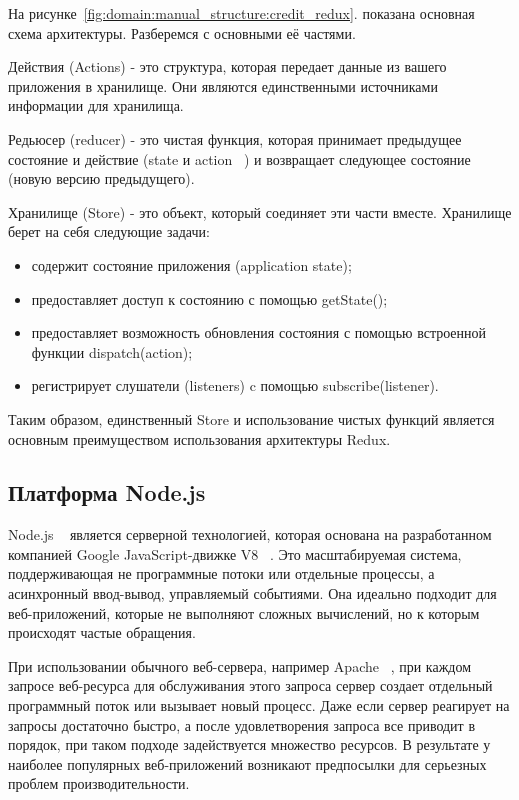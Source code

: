 На рисунке~\ref{fig:domain:manual_structure:credit_redux}. показана основная схема архитектуры. Разберемся с основными её частями.

Действия (Actions) - это структура, которая передает данные из вашего приложения в хранилище. Они являются единственными источниками информации для хранилища.

Редьюсер (reducer) - это чистая функция, которая принимает предыдущее состояние и действие (state и action ~\cite{redux_framework}) и возвращает следующее состояние (новую версию предыдущего).

Хранилище (Store) - это объект, который соединяет эти части вместе. Хранилище берет на себя следующие задачи:
\begin{itemize}
  \item содержит состояние приложения (application state);
  \item предоставляет доступ к состоянию с помощью getState();
  \item предоставляет возможность обновления состояния с помощью встроенной функции dispatch(action);
  \item регистрирует слушатели (listeners) c помощью subscribe(listener).
\end{itemize}

Таким образом, единственный Store и использование чистых функций является основным преимуществом использования архитектуры Redux.


\subsection{Платформа Node.js}
\label{sub:domain:mdl_principle}
Node.js ~\cite{node_js} является серверной технологией, которая основана на разработанном компанией Google JavaScript-движке V8 ~\cite{V8}. Это масштабируемая система, поддерживающая не программные потоки или отдельные процессы, а асинхронный ввод-вывод, управляемый событиями. Она идеально подходит для веб-приложений, которые не выполняют сложных вычислений, но к которым происходят частые обращения.

При использовании обычного веб-сервера, например Apache ~\cite{apache}, при каждом запросе веб-ресурса для обслуживания этого запроса сервер создает отдельный программный поток или вызывает новый процесс. Даже если сервер реагирует на запросы достаточно быстро, а после удовлетворения запроса все приводит в порядок, при таком подходе задействуется множество ресурсов. В результате у наиболее популярных веб-приложений возникают предпосылки для серьезных проблем производительности.

